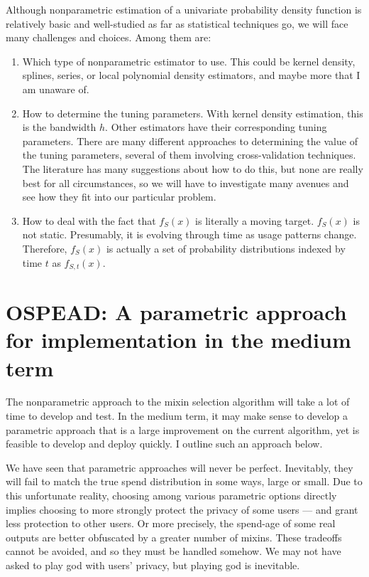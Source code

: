 \documentclass[english]{paper}
\begin{document}
Although nonparametric estimation of a univariate probability density
function is relatively basic and well-studied as far as statistical
techniques go, we will face many challenges and choices. Among them
are:
\begin{enumerate}
\item Which type of nonparametric estimator to use. This could be kernel
density, splines, series, or local polynomial density estimators,
and maybe more that I am unaware of.
\item How to determine the tuning parameters. With kernel density estimation,
this is the bandwidth $h$. Other estimators have their corresponding
tuning parameters. There are many different approaches to determining
the value of the tuning parameters, several of them involving cross-validation
techniques. The literature has many suggestions about how to do this,
but none are really \textquotedbl best\textquotedbl{} for all circumstances,
so we will have to investigate many avenues and see how they fit into
our particular problem.
\item How to deal with the fact that $f_{S}(x)$ is literally a moving target.
$f_{S}(x)$ is not static. Presumably, it is evolving through time
as usage patterns change. Therefore, $f_{S}(x)$ is actually a set
of probability distributions indexed by time $t$ as $f_{S,t}(x)$.
\end{enumerate}

\section{OSPEAD: A parametric approach for implementation in the medium term}

The nonparametric approach to the mixin selection algorithm will take
a lot of time to develop and test. In the medium term, it may make
sense to develop a parametric approach that is a large improvement
on the current algorithm, yet is feasible to develop and deploy quickly.
I outline such an approach below.

We have seen that parametric approaches will never be perfect. Inevitably,
they will fail to match the true spend distribution in some ways,
large or small. Due to this unfortunate reality, choosing among various
parametric options directly implies choosing to more strongly protect
the privacy of some users --- and grant less protection to other
users. Or more precisely, the spend-age of some real outputs are better
obfuscated by a greater number of mixins. These tradeoffs cannot be
avoided, and so they must be handled somehow. We may not have asked
to play god with users' privacy, but playing god is inevitable.
\end{document}

